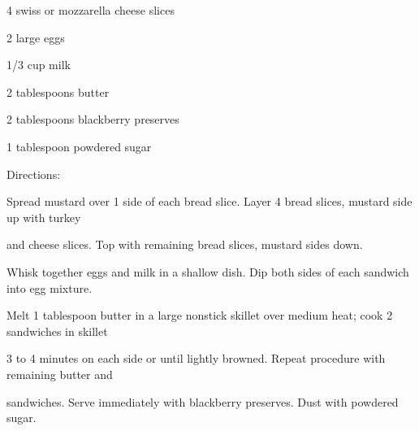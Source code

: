 \documentclass[a4paper,portrait,12pt]{book}
\begin{document}
4 swiss or mozzarella cheese slices




2 large eggs




1/3 cup milk




2 tablespoons butter




2 tablespoons blackberry preserves




1 tablespoon powdered sugar




Directions:




Spread mustard over 1 side of each bread slice. Layer 4 bread slices, mustard side up with turkey




and cheese slices. Top with remaining bread slices, mustard sides down.




Whisk together eggs and milk in a shallow dish. Dip both sides of each sandwich into egg mixture.




Melt 1 tablespoon butter in a large nonstick skillet over medium heat; cook 2 sandwiches in skillet




3 to 4 minutes on each side or until lightly browned. Repeat procedure with remaining butter and




sandwiches. Serve immediately with blackberry preserves. Dust with powdered sugar.
\end{document}
